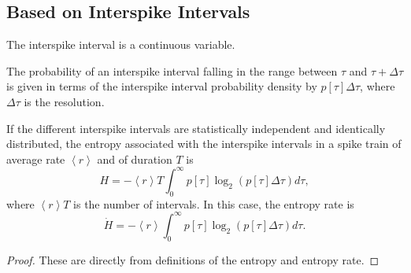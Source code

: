 \subsection{Based on Interspike Intervals}
\begin{rem}
  The interspike interval is a continuous variable.
\end{rem}
\begin{ntn}
  The probability of an interspike interval falling in the range between $\tau$ and $\tau+\Delta\tau$ is given in terms of the interspike interval probability density by $p[\tau]\Delta\tau$, where $\Delta\tau$ is the resolution.
\end{ntn}

\begin{prop}
  \label{prop:independentInterspike}
  If the different interspike intervals are statistically independent and identically distributed, the entropy associated with the interspike intervals in a spike train of average rate $\left<r\right>$ and of duration $T$ is
  \begin{displaymath}
    H = -\left<r\right>T\int_0^{\infty}p[\tau]\log_2(p[\tau]\Delta\tau)d\tau,
  \end{displaymath}
  where $\left<r\right>T$ is the number of intervals. In this case, the entropy rate is
  \begin{displaymath}
    \dot{H} = -\left<r\right>\int_0^{\infty}p[\tau]\log_2(p[\tau]\Delta\tau)d\tau.
  \end{displaymath}
\end{prop}
\begin{proof}
  These are directly from definitions of the entropy and entropy rate.
\end{proof}

